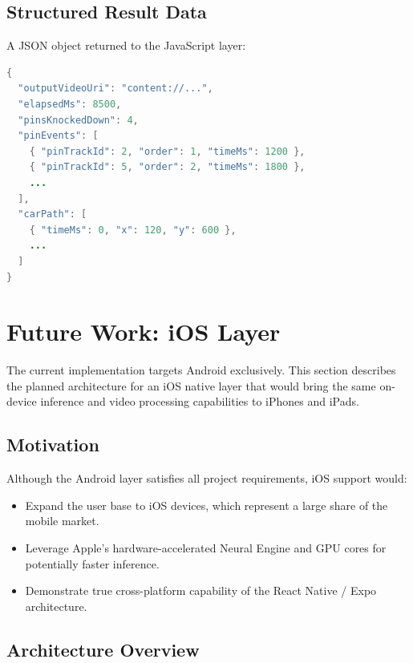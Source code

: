 \documentclass{zc-ust-hw}
\begin{document}
\subsection{Structured Result Data}

A JSON object returned to the JavaScript layer:

\begin{lstlisting}[language=Java, caption={Structured result JSON returned to the JS layer.}]
{
  "outputVideoUri": "content://...",
  "elapsedMs": 8500,
  "pinsKnockedDown": 4,
  "pinEvents": [
    { "pinTrackId": 2, "order": 1, "timeMs": 1200 },
    { "pinTrackId": 5, "order": 2, "timeMs": 1800 },
    ...
  ],
  "carPath": [
    { "timeMs": 0, "x": 120, "y": 600 },
    ...
  ]
}
\end{lstlisting}

\section{Future Work: iOS Layer}
\label{sec:future-ios}

The current implementation targets Android exclusively.
This section describes the planned architecture for an iOS native layer that would bring the same on-device inference and video processing capabilities to iPhones and iPads.

\subsection{Motivation}

Although the Android layer satisfies all project requirements, iOS support would:
\begin{itemize}
    \item Expand the user base to iOS devices, which represent a large share of the mobile market.
    \item Leverage Apple's hardware-accelerated Neural Engine and GPU cores for potentially faster inference.
    \item Demonstrate true cross-platform capability of the React Native / Expo architecture.
\end{itemize}

\subsection{Architecture Overview}
\end{document}
